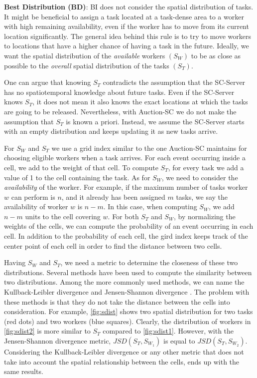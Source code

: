 \noindent \textbf{Best Distribution (BD)}: 
BI does not consider the spatial distribution of tasks. It might be beneficial to assign a task located at a task-dense area to a worker with high remaining availability, even if the worker has to move from its current location significantly. The general idea behind this rule is to try to move workers to locations that have a higher chance of having a task in the future. Ideally, we want the spatial distribution of the \textit{available} workers $(S_W)$ to be as close as possible to the \textit{overall} spatial distribution of the tasks $(S_T)$.

One can argue that knowing $S_T$ contradicts the assumption that the SC-Server has no spatiotemporal knowledge about future tasks. Even if the SC-Server knows $S_T$, it does not mean it also knows the exact locations at which the tasks are going to be released. Nevertheless, with Auction-SC we do not make the assumption that $S_T$ is known a priori. Instead, we assume the SC-Server starts with an empty distribution and keeps updating it as new tasks arrive.

For $S_W$ and $S_T$ we use a grid index similar to the one Auction-SC maintains for choosing eligible workers when a task arrives. For each event occurring inside a cell, we add to the weight of that cell. To compute $S_T$, for every task we add a value of 1 to the cell containing the task. As for $S_W$, we need to consider the \textit{availability} of the worker. For example, if the maximum number of tasks worker $w$ can perform is $n$, and it already has been assigned $m$ tasks, we say the availability of worker $w$ is $n-m$. In this case, when computing $S_W$, we add $n-m$ units to the cell covering $w$. For both $S_T$ and $S_W$, by normalizing the weights of the cells, we can compute the probability of an event occurring in each cell. In addition to the probability of each cell, the gird index keeps track of the center point of each cell in order to find the distance between two cells.

Having $S_W$ and $S_T$, we need a metric to determine the closeness of these two distributions. Several methods have been used to compute the similarity between two distributions. Among the more commonly used methods, we can name the Kullback-Leibler divergence \cite{Kullback51} and Jensen-Shannon divergence \cite{Lin91}. The problem with these methods is that they do not take the distance between the cells into consideration. For example, \cref{fig:sdist} shows two spatial distribution for two tasks (red dots) and two workers (blue squares). Clearly, the distribution of workers in \cref{fig:sdist2} is more similar to $S_T$ compared to \cref{fig:sdist1}. However, with the Jensen-Shannon divergence metric, $JSD(S_T, S_{W_1})$ is equal to $JSD(S_T, S_{W_2})$. Considering the Kullback-Leibler divergence or any other metric that does not take into account the spatial relationship between the cells, ends up with the same results.

